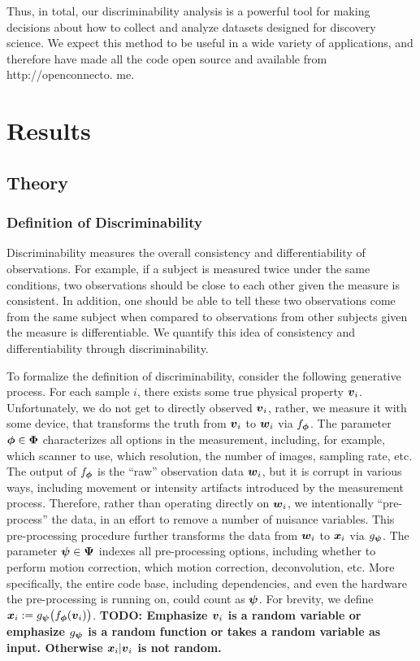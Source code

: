 \documentclass{article}
\begin{document}
Thus, in total, our discriminability analysis is a powerful tool for making decisions about how to collect and analyze
datasets designed for discovery science. We expect this method to be useful in a wide variety of applications,
and therefore have made all the code open source and available from http://openconnecto.
me.




\section{Results}



\subsection{Theory}

\subsubsection{Definition of Discriminability}
 Discriminability measures the overall consistency and differentiability of observations. For example, if a subject is measured twice under the same conditions, two observations should be close to each other given the measure is consistent. In addition, one should be able to tell these two observations come from the same subject when compared to observations from other subjects given the measure is differentiable. We quantify this idea of consistency and differentiability through discriminability. 
 
To formalize the definition of discriminability, consider the following generative process. For each sample $i$, there exists some true physical property $\boldsymbol{v}_i$. Unfortunately, we do not get to directly observed $\boldsymbol{v}_i$, rather, we measure it with some device, that transforms the truth from $\boldsymbol{v}_i$ to $\boldsymbol{w}_i$ via $f_{\boldsymbol{\phi}}$.  The parameter $\boldsymbol{\phi} \in \boldsymbol{\Phi}$ characterizes all options in the measurement, including, for example, which scanner to use, which resolution, the number of images, sampling rate, etc.  The output of $f_{\boldsymbol{\phi}}$ is the  ``raw'' observation data $\boldsymbol{w}_i$, but it is corrupt in various ways, including movement or intensity artifacts introduced by the measurement process.  Therefore, rather than operating directly on $\boldsymbol{w}_i$, we intentionally ``pre-process'' the data, in an effort to remove a number of nuisance variables.  This pre-processing procedure further transforms the data from $\boldsymbol{w}_i$ to $\boldsymbol{x}_i$ via $g_{\boldsymbol{\psi}}$.   The parameter $\boldsymbol{\psi} \in \boldsymbol{\Psi}$ indexes all pre-processing options, including whether to perform motion correction, which motion correction, deconvolution, etc.  More specifically, the entire code base, including dependencies, and even the hardware the pre-processing is running on, could count as $\boldsymbol{\psi}$. For brevity, we define $\boldsymbol{x}_i:= g_{\boldsymbol{\psi}} \big(f_{\boldsymbol{\phi}} (\boldsymbol{v}_i) \big)$. {\bf TODO: Emphasize $\boldsymbol{v}_i$ is a random variable or emphasize $g_{\boldsymbol{\psi}}$ is a random function or takes a random variable as input. Otherwise $\boldsymbol{x}_i|\boldsymbol{v}_i$ is not random.}
\end{document}
